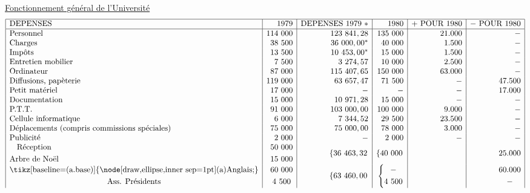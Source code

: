 \uline{Fonctionnement général de l'Université}
\[
\begin{array}{|l|r|r|r|r|r|}\hline
\text{DEPENSES}&1979&\text{DEPENSES }1979\ *&1980&+\ \text{POUR }1980&-\ \text{POUR }1980\\\hline
\text{Personnel}&114\ 000&123\ 841,28&135\ 000&21.000&-\\
\text{Charges}&38\ 500&36\ 000,00^*&40\ 000&1.500&-\\
\text{Impôts}&13\ 500&10\ 453,00^*&15\ 000&1.500&-\\
\text{Entretien mobilier}&7\ 500&3\ 274,57&10\ 000&2.500&-\\
\text{Ordinateur}&87\ 000&115\ 407,65&150\ 000&63.000&-\\
\text{Diffusions, papèterie}&119\ 000&63\ 657,47&71\ 500&-&47.500\\
\text{Petit matériel}&17\ 000&-&-&-&17.000\\
\text{Documentation}&15\ 000&10\ 971,28&15\ 000&-&-\\
\text{P.T.T.}&91\ 000&103\ 000,00&100\ 000&9.000&-\\
\text{Cellule informatique}&6\ 000&7\ 344,52&29\ 500&23.500&-\\
\text{Déplacements (compris commissions spéciales)}&75\ 000&75\ 000,00&78\ 000&3.000&-\\
\text{Publicité}&2\ 000&-&2\ 000&-&-\\
\begin{gathered}\text{Réception}\\\text{Arbre de Noël}\end{gathered}&\begin{gathered}50\ 000\\15\ 000\end{gathered}&\left\{36\ 463,32\right.&\left\{40\ 000\right.&&25.000\\
\begin{gathered}\text{\tikz[baseline=(a.base)]{\node[draw,ellipse,inner sep=1pt](a){Anglais};}}\\\text{Ass. Présidents}\end{gathered}&\begin{gathered}60\ 000\\4\ 500\end{gathered}&\left\{63\ 460,00\right.&\left\{\begin{gathered}-\\4\ 500\end{gathered}\right.&&\begin{gathered}60.000\\-\end{gathered}\\

\end{array}\]
